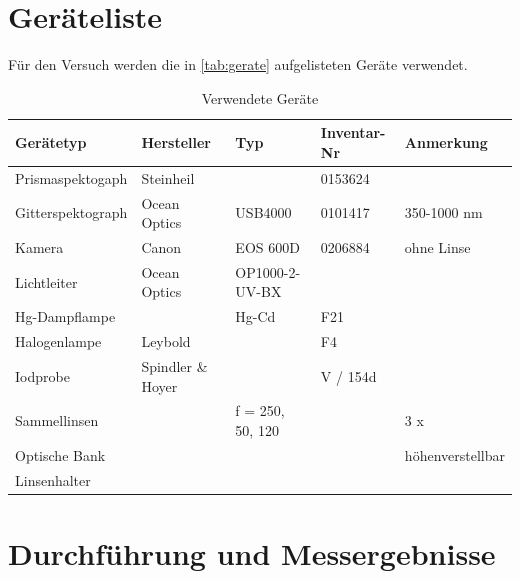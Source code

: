 \documentclass[12pt,english,ngerman]{scrartcl}
\begin{document}
\section{Geräteliste}
\label{sec:geraeteliste}

Für den Versuch werden die in \autoref{tab:gerate} aufgelisteten Geräte verwendet.

\begin{table}[H]
	\caption{Verwendete Geräte}
	\begin{tabular}{|l|l|l|l|l|}
	\hline
	\textbf{Gerätetyp} & \textbf{Hersteller} & \textbf{Typ}     & \textbf{Inventar-Nr} & \textbf{Anmerkung} \\ \hline
	Prismaspektogaph   & Steinheil           &                  & 0153624              &                    \\ \hline
	Gitterspektograph  & Ocean Optics        & USB4000          & 0101417              & 350-1000 nm        \\ \hline
	Kamera             & Canon               & EOS 600D         & 0206884              & ohne Linse         \\ \hline
	Lichtleiter        & Ocean Optics        & OP1000-2-UV-BX   &                      &                    \\ \hline
	Hg-Dampflampe      &                     & Hg-Cd            & F21                  &                    \\ \hline
	Halogenlampe       & Leybold             &                  & F4                   &                    \\ \hline
	Iodprobe           & Spindler \& Hoyer   &                  & V / 154d             &                    \\ \hline
	Sammellinsen       &                     & f = 250, 50, 120 &   & 3 x                \\ \hline
	Optische Bank      &                     &                  &                      & höhenverstellbar   \\ \hline
	Linsenhalter       &                     &                  &                      &                    \\ \hline
	\end{tabular}
	\label{tab:gerate}
	\end{table}


\section{Durchführung und Messergebnisse}\label{sec:durchfuhrung}
\end{document}
